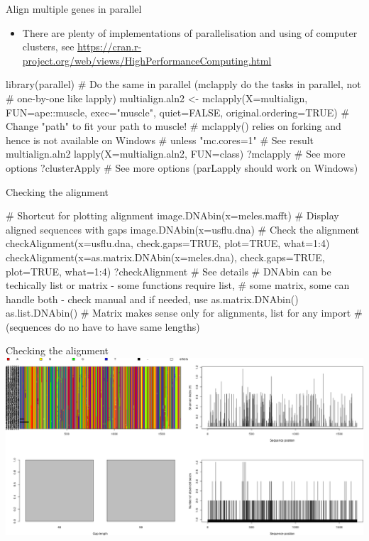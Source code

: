 \documentclass[compress, ucs, xelatex, 11pt, xcolor=svgnames,
  hyperref={
    bookmarks=true,
    unicode=true,
    colorlinks=true,
    pdftitle={Molecular data in R},
    plainpages=false,
    pdfauthor={Vojtech Zeisek},
    pdfsubject={Course about phylogeny and evolution in R},
    pdfcreator={XeLaTeX},
    pdfkeywords={R, evolution, phylogeny, molecular data},
    linkcolor=Tomato,
    anchorcolor=SaddleBrown,
    citecolor=Goldenrod,
    filecolor=DarkMagenta,
    menucolor=Sienna,
    urlcolor=DarkTurquoise,
    pdftex},
  url={hyphens, lowtilde} %
  ]{beamer}
\begin{document}
\begin{frame}[fragile]{Align multiple genes in parallel}
  \begin{itemize}
    \item There are plenty of implementations of parallelisation and using of computer clusters, see \url{https://cran.r-project.org/web/views/HighPerformanceComputing.html}
  \end{itemize}
  \begin{spluscode}
    library(parallel)
    # Do the same in parallel (mclapply do the tasks in parallel, not
    # one-by-one like lapply)
    multialign.aln2 <- mclapply(X=multialign, FUN=ape::muscle, 
      exec="muscle", quiet=FALSE, original.ordering=TRUE)
    # Change "path" to fit your path to muscle!
    # mclapply() relies on forking and hence is not available on Windows
    # unless "mc.cores=1"
    # See result
    multialign.aln2
    lapply(X=multialign.aln2, FUN=class)
    ?mclapply # See more options
    ?clusterApply # See more options (parLapply should work on Windows)
  \end{spluscode}
\end{frame}

\begin{frame}[fragile]{Checking the alignment}
  \begin{spluscode}
    # Shortcut for plotting alignment
    image.DNAbin(x=meles.mafft)
    # Display aligned sequences with gaps
    image.DNAbin(x=usflu.dna)
    # Check the alignment
    checkAlignment(x=usflu.dna, check.gaps=TRUE, plot=TRUE, what=1:4)
    checkAlignment(x=as.matrix.DNAbin(x=meles.dna), check.gaps=TRUE,
      plot=TRUE, what=1:4)
    ?checkAlignment # See details
    # DNAbin can be techically list or matrix - some functions require list,
    # some matrix, some can handle both - check manual and if needed, use
    as.matrix.DNAbin()
    as.list.DNAbin()
    # Matrix makes sense only for alignments, list for any import
    # (sequences do no have to have same lengths)
  \end{spluscode}
\end{frame}

\begin{frame}{Checking the alignment}
  \includegraphics[width=\textwidth]{checkalignment.png}
\end{frame}
\end{document}
